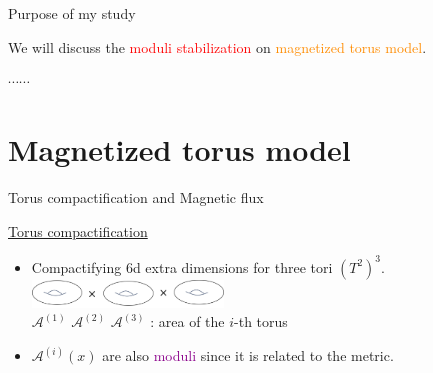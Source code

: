 \documentclass[
  unicode,a4paper,10pt,
  xcolor = {dvipsnames,svgnames},
  hyperref ={colorlinks=true,citecolor=Navy,linkcolor=NavyBlue,urlcolor=purple},
  ja=standard,lualatex
]{beamer}
\begin{document}
\begin{frame}{Purpose of my study}

  We will discuss the \textcolor{Red}{moduli stabilization} on \textcolor{DarkOrange}{magnetized torus model}.

  $\cdots\cdots$




\end{frame}


\section{Magnetized torus model}

\begin{frame}
  \huge \secname
\end{frame}

\begin{frame}{Torus compactification and Magnetic flux}

  \uline{Torus compactification}
  \begin{itemize}
    \item
          Compactifying 6d extra dimensions for three tori $(T^2)^3$.
          \\
          \vspace*{5pt}
          \hspace*{2.8cm}\includegraphics[width=0.4\textwidth]{fig/tori.png}
          \\
          \hspace*{3.0cm}
          $\mathcal{A}^{(1)}$
          \hspace*{1.0cm}
          $\mathcal{A}^{(2)}$
          \hspace*{1.0cm}
          $\mathcal{A}^{(3)}$
          \hspace*{0.5cm}
          : area of the $i$-th torus
    \item
          $\mathcal{A}^{(i)}(x)$ are also \textcolor{DarkMagenta}{moduli} since it is related to the metric.
  \end{itemize}

  \vspace*{15pt}

  \pause


\end{frame}
\end{document}
